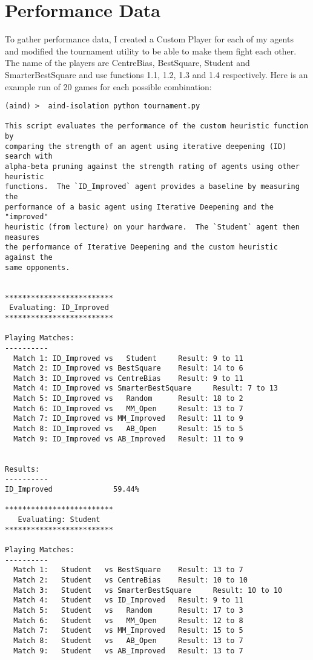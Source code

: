 \documentclass{article}
\begin{document}
\section{Performance Data}
To gather performance data, I created a Custom Player for each of my agents and modified the tournament utility to be able to make them fight each other. The name of the players are CentreBias, BestSquare, Student and SmarterBestSquare and use functions 1.1, 1.2, 1.3 and 1.4 respectively. Here is an example run of 20 games for each possible combination:
\begin{lstlisting}
(aind) >  aind-isolation python tournament.py

This script evaluates the performance of the custom heuristic function by
comparing the strength of an agent using iterative deepening (ID) search with
alpha-beta pruning against the strength rating of agents using other heuristic
functions.  The `ID_Improved` agent provides a baseline by measuring the
performance of a basic agent using Iterative Deepening and the "improved"
heuristic (from lecture) on your hardware.  The `Student` agent then measures
the performance of Iterative Deepening and the custom heuristic against the
same opponents.


*************************
 Evaluating: ID_Improved 
*************************

Playing Matches:
----------
  Match 1: ID_Improved vs   Student     Result: 9 to 11
  Match 2: ID_Improved vs BestSquare    Result: 14 to 6
  Match 3: ID_Improved vs CentreBias    Result: 9 to 11
  Match 4: ID_Improved vs SmarterBestSquare     Result: 7 to 13
  Match 5: ID_Improved vs   Random      Result: 18 to 2
  Match 6: ID_Improved vs   MM_Open     Result: 13 to 7
  Match 7: ID_Improved vs MM_Improved   Result: 11 to 9
  Match 8: ID_Improved vs   AB_Open     Result: 15 to 5
  Match 9: ID_Improved vs AB_Improved   Result: 11 to 9


Results:
----------
ID_Improved              59.44%

*************************
   Evaluating: Student   
*************************

Playing Matches:
----------
  Match 1:   Student   vs BestSquare    Result: 13 to 7
  Match 2:   Student   vs CentreBias    Result: 10 to 10
  Match 3:   Student   vs SmarterBestSquare     Result: 10 to 10
  Match 4:   Student   vs ID_Improved   Result: 9 to 11
  Match 5:   Student   vs   Random      Result: 17 to 3
  Match 6:   Student   vs   MM_Open     Result: 12 to 8
  Match 7:   Student   vs MM_Improved   Result: 15 to 5
  Match 8:   Student   vs   AB_Open     Result: 13 to 7
  Match 9:   Student   vs AB_Improved   Result: 13 to 7



\end{lstlisting}
\end{document}
